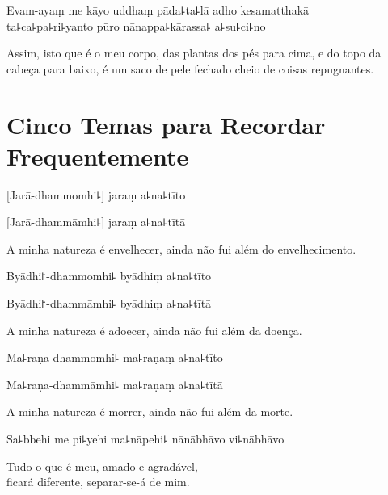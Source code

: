 Evam-ayaṃ me kāyo uddhaṃ pāda꜕ta꜕lā adho kesamatthakā\\
ta꜕ca꜕pa꜕ri꜕yanto pūro nānappa꜕kārassa꜕ a꜕su꜕ci꜕no

\begin{english}
  Assim, isto que é o meu corpo, das plantas dos pés para cima, e do topo da cabeça para baixo, é um saco de pele fechado cheio de coisas repugnantes.
\end{english}

\chapter[Cinco Temas]{Cinco Temas para Recordar Frequentemente}


\begin{leader}
\end{leader}

%
[Jarā-dhammomhi꜕] jaraṃ a꜕na꜕tīto

%
[Jarā-dhammāmhi꜕] jaraṃ a꜕na꜕tītā

\begin{english}
  A minha natureza é envelhecer, ainda não fui além do envelhecimento.
\end{english}

%
Byādhi꜓-dhammomhi꜕ byādhiṃ a꜕na꜕tīto

%
Byādhi꜓-dhammāmhi꜕ byādhiṃ a꜕na꜕tītā

\begin{english}
  A minha natureza é adoecer, ainda não fui além da doença.
\end{english}

%
Ma꜕raṇa-dhammomhi꜕ ma꜕raṇaṃ a꜕na꜕tīto

%
Ma꜕raṇa-dhammāmhi꜕ ma꜕raṇaṃ a꜕na꜕tītā

\begin{english}
  A minha natureza é morrer, ainda não fui além da morte.
\end{english}

Sa꜕bbehi me pi꜕yehi ma꜕nāpehi꜕ nānābhāvo vi꜕nābhāvo

\begin{english}
  Tudo o que é meu, amado e agradável,\\
  ficará diferente, separar-se-á de mim.
\end{english}

